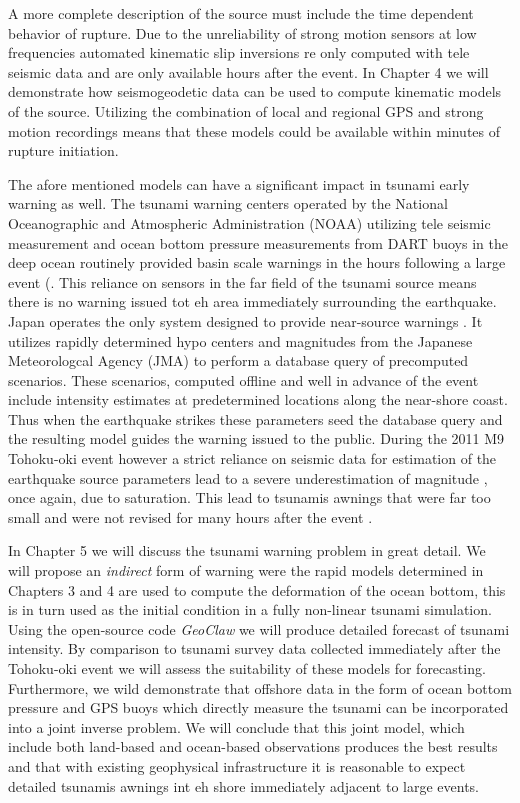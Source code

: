 A more complete description of the source must include the time dependent behavior of rupture. Due to the unreliability of strong motion sensors at low frequencies automated kinematic slip inversions re only computed with tele seismic data \citep{ji2002} and are only available hours after the event. In Chapter 4 we will demonstrate how seismogeodetic data can be used to compute kinematic models of the source. Utilizing the combination of local and regional GPS and strong motion recordings means that these models could be available within minutes of rupture initiation.

The afore mentioned models can have a significant impact in tsunami early warning as well. The tsunami warning centers operated by the National Oceanographic and Atmospheric Administration (NOAA) utilizing tele seismic measurement and ocean bottom pressure measurements from DART buoys in the deep ocean routinely provided basin scale warnings in the hours following a large event (\citep{gonzalez2005,titov2005,mungov2013}. This reliance on sensors in the far field of the tsunami source means there is no warning issued tot eh area immediately surrounding the earthquake. Japan operates the only system designed to provide near-source warnings \citep{tatehata1997,ozaki2011}. It utilizes rapidly determined hypo centers and magnitudes from the Japanese Meteorologcal Agency (JMA) to perform a database query of precomputed scenarios. These scenarios, computed offline and well in advance of the event include intensity estimates at predetermined locations along the near-shore coast. Thus when the earthquake strikes these parameters seed the database query and the resulting model guides the warning issued to the public. During the 2011 M9 Tohoku-oki event however a strict reliance on seismic data for estimation of the earthquake source parameters lead to a severe underestimation of magnitude \citep{hoshiba2011}, once again, due to saturation. This lead to tsunamis awnings that were far too small and were not revised for many hours after the event \citep{ozaki2011}.

In Chapter 5 we will discuss the tsunami warning problem in great detail. We will propose an \textit{indirect} form of warning were the rapid models determined in Chapters 3 and 4 are used to compute the deformation of the ocean bottom, this is in turn used as the initial condition in a  fully non-linear tsunami simulation. Using the open-source code \textit{GeoClaw} \citep{leveque2011} we will produce detailed forecast of tsunami intensity. By comparison to tsunami survey data collected immediately after the Tohoku-oki event \citep{mori2011,mori2012} we will assess the suitability of these models for forecasting. Furthermore, we wild demonstrate that offshore data in the form of ocean bottom pressure and GPS buoys which directly measure the tsunami can be incorporated into a joint inverse problem. We will conclude that this joint model, which include both land-based and ocean-based observations produces the best results and that with existing geophysical infrastructure it is reasonable to expect detailed tsunamis awnings int eh shore immediately adjacent to large events.



